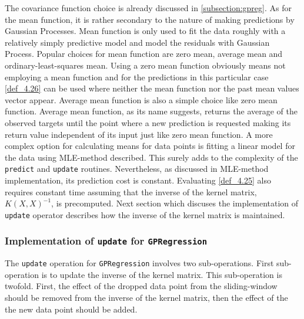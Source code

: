 The covariance function choice is already discussed in \ref{subsection:gpreg}. As for the mean function, it is rather secondary to the nature of making predictions by Gaussian Processes. Mean function is only used to fit the data roughly with a relatively simply predictive model and model the residuals with Gaussian Process. Popular choices for mean function are zero mean, average mean and ordinary-least-squares mean. Using a zero mean function obviously means not employing a mean function and for the predictions in this particular case \ref{def_4.26} can be used where neither the mean function nor the past mean values vector appear. Average mean function is also a simple choice like zero mean function. Average mean function, as its name suggests, returns the average of the observed targets until the point where a new prediction is requested making its return value independent of its input just like zero mean function. A more complex option for calculating means for data points is fitting a linear model for the data using MLE-method described. This surely adds to the complexity of the \texttt{predict} and \texttt{update} routines. Nevertheless, as discussed in MLE-method implementation, its prediction cost is constant. Evaluating \ref{def_4.25} also requires constant time assuming that the inverse of the kernel matrix, $K(X,X)^{-1}$, is precomputed. Next section which discuses the implementation of \texttt{update} operator describes how the inverse of the kernel matrix is maintained.

\subsubsection{Implementation of \texttt{update} for \texttt{GPRegression}}

The \texttt{update} operation for \texttt{GPRegression} involves two sub-operations. First sub-operation is to update the inverse of the kernel matrix. This sub-operation is twofold. First, the effect of the dropped data point from the sliding-window should be removed from the inverse of the kernel matrix, then the effect of the the new data point should be added.

